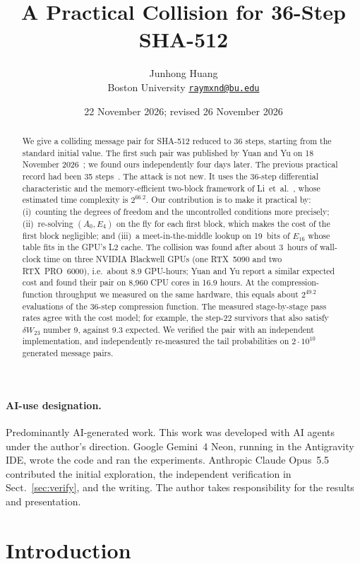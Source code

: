 \documentclass[11pt]{article}
\title{A Practical Collision for 36-Step SHA-512}
\author{Junhong Huang\\ Boston University \quad \href{mailto:raymxnd@bu.edu}{\texttt{raymxnd@bu.edu}}}
\date{22 November 2026; revised 26 November 2026}
\begin{document}
\maketitle

\begin{abstract}
We give a colliding message pair for SHA-512 reduced to 36 steps, starting from the standard initial value. The first such pair was published by Yuan and Yu on 18 November 2026~\cite{YY26}; we found ours independently four days later. The previous practical record had been 35 steps~\cite{LLWS26}. The attack is not new. It uses the 36-step differential characteristic and the memory-efficient two-block framework of Li~et~al.~\cite{LZLLQZ26}, whose estimated time complexity is $2^{66.2}$. Our contribution is to make it practical by:
(i)~counting the degrees of freedom and the uncontrolled conditions more precisely;
(ii)~re-solving $(A_0,E_4)$ on the fly for each first block, which makes the cost of the first block negligible; and
(iii)~a meet-in-the-middle lookup on 19~bits of $E_{16}$ whose table fits in the GPU's L2 cache.
The collision was found after about 3~hours of wall-clock time on three NVIDIA Blackwell GPUs (one RTX~5090 and two RTX~PRO~6000), i.e.\ about $8.9$ GPU-hours; Yuan and Yu report a similar expected cost and found their pair on 8{,}960 CPU cores in 16.9 hours. At the compression-function throughput we measured on the same hardware, this equals about $2^{49.2}$ evaluations of the 36-step compression function. The measured stage-by-stage pass rates agree with the cost model; for example, the step-22 survivors that also satisfy $\delta W_{23}$ number 9, against 9.3 expected. We verified the pair with an independent implementation, and independently re-measured the tail probabilities on $2\cdot 10^{10}$ generated message pairs.
\end{abstract}

\paragraph{AI-use designation.} Predominantly AI-generated work. This work was developed with AI agents under the author's direction. Google Gemini~4 Neon, running in the Antigravity IDE, wrote the code and ran the experiments. Anthropic Claude Opus~5.5 contributed the initial exploration, the independent verification in Sect.~\ref{sec:verify}, and the writing. The author takes responsibility for the results and presentation.

\section{Introduction}
\end{document}

